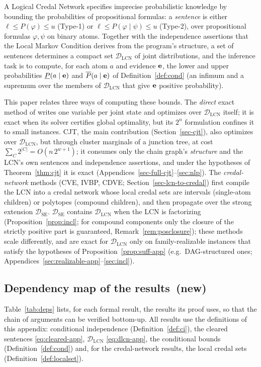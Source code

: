 \documentclass{article} %
\DeclareRobustCommand{\rev}[1]{{\color{blue}#1}}
\newcommand{\newtag}{\texorpdfstring{~\rev{(new)}}{}}
\newcommand{\lo}{\underline}
\newcommand{\hi}{\overline}
\newcommand{\DSE}{\mathcal{D}_{\mathrm{SE}}}
\newcommand{\DLCN}{\mathcal{D}_{\mathrm{LCN}}}
\begin{document}
A Logical Credal Network specifies imprecise probabilistic knowledge by
bounding the probabilities of propositional formulas: a \emph{sentence} is either
$\ell\le P(\varphi)\le u$ (Type-1) or $\ell\le P(\varphi\mid\psi)\le u$
(Type-2), over propositional formulas $\varphi,\psi$ on binary atoms. Together
with the independence assertions that the Local Markov Condition derives from
the program's structure, a set of sentences determines a compact set $\DLCN$ of
joint distributions, and the inference task is to compute, for each atom $a$
and evidence $\mathbf{e}$, the lower and upper probabilities $\lo P(a\mid\be)$ and
$\hi P(a\mid\be)$ of Definition~\ref{def:cond} (an infimum and a supremum over
the members of $\DLCN$ that give $\mathbf{e}$ positive probability).

This paper relates three ways of computing these bounds. The \emph{direct}
exact method of \cite{marinescu2022neurips} writes one variable per joint state
and optimizes over $\DLCN$ itself; it is exact when its solver certifies global
optimality, but its $2^n$ formulation confines it to small instances.
\textsc{CJT}, the main contribution (Section~\ref{sec-cjt}), also optimizes over
$\DLCN$, but through cluster marginals of a junction tree, at cost
$\sum_C 2^{|C|}=O(n\,2^{w+1})$; it consumes only the chain graph's
\emph{structure} and the LCN's own sentences and independence assertions, and
under the hypotheses of Theorem~\ref{thm:cjt} it is exact
(Appendices~\ref{sec-full-cjt}--\ref{sec:nlp}). The \emph{credal-network}
methods (CVE, IVBP, CDVE; Section~\ref{sec-lcn-to-credal}) first compile the LCN
into a credal network whose local credal sets are intervals (single-atom
children) or polytopes (compound children), and then propagate over the strong
extension $\DSE$. $\DSE$ contains $\DLCN$ when the LCN is factorizing
(Proposition~\ref{prop:incl}; for compound components only the closure of the
strictly positive part is guaranteed, Remark~\ref{rem:posclosure}); these methods
scale differently, and are exact for $\DLCN$ only on family-realizable instances
that satisfy the hypotheses of Proposition~\ref{prop:suff-app} (e.g.\
DAG-structured ones; Appendices~\ref{sec:realizable-app}--\ref{sec:incl}).

\subsection{Dependency map of the results\newtag}\label{sec:prelim-deps}
Table~\ref{tab:deps} lists, for each formal result, the results its proof uses,
so that the chain of arguments can be verified bottom-up. All results use the
definitions of this appendix: conditional independence (Definition~\ref{def:ci}),
the cleared sentences \eqref{eq:cleared-app}, $\DLCN$ \eqref{eq:dlcn-app}, the
conditional bounds (Definition~\ref{def:cond}) and, for the credal-network
results, the local credal sets (Definition~\ref{def:localset}).
\end{document}
